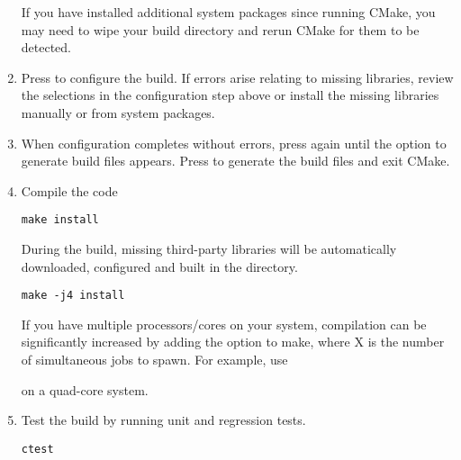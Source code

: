 \begin{enumerate}
\begin{notebox}
    If you have installed additional system packages since running CMake, you may need to wipe your build directory and rerun CMake for them to be detected.
    \end{notebox}


    \item Press  to configure the build. If errors arise relating to
    missing libraries, review the  selections in
    the configuration step above or install the missing libraries manually or
    from system packages.

    \item When configuration completes without errors, press  again
    until the option  to generate build files appears. Press 
    to generate the build files and exit CMake.

    \item Compile the code
    \begin{lstlisting}[style=BashInputStyle]
        make install
    \end{lstlisting}
    During the build, missing third-party libraries will be automatically
    downloaded, configured and built in the \nekpp {} directory.

    \newsavebox\installationLinuxTip
    \begin{lrbox}{\installationLinuxTip}\begin{minipage}{0.8\linewidth}
    \begin{lstlisting}[style=BashInputStyle]
    make -j4 install
    \end{lstlisting}
    \end{minipage}
    \end{lrbox}

    \begin{tipbox}
    If you have multiple processors/cores on your system, compilation can be
    significantly increased by adding the  option to make, where X is
    the number of simultaneous jobs to spawn. For example, use

    \noindent\usebox\installationLinuxTip

    on a quad-core system.
    \end{tipbox}

    \item Test the build by running unit and regression tests.
    \begin{lstlisting}[style=BashInputStyle]
    ctest
    \end{lstlisting}
\end{enumerate}

